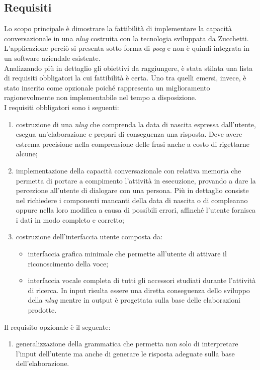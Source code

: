 	\subsection{Requisiti}
	Lo scopo principale è dimostrare la fattibilità di implementare la capacità conversazionale in una \emph{\gls{nlug}} costruita con la tecnologia sviluppata da Zucchetti. L'applicazione perciò si presenta sotto forma di \emph{\gls{pocg}} e non è quindi integrata in un software aziendale esistente. \\
	Analizzando più in dettaglio gli obiettivi da raggiungere, è stata stilata una lista di requisiti obbligatori la cui fattibilità è certa. Uno tra quelli emersi, invece, è stato inserito come opzionale poiché rappresenta un miglioramento ragionevolmente non implementabile nel tempo a disposizione. \\
	I requisiti obbligatori sono i seguenti:
	\begin{enumerate}
		\item costruzione di una \emph{\gls{nlug}} che comprenda la data di nascita espressa dall'utente, esegua un'elaborazione e prepari di conseguenza una risposta. Deve avere estrema precisione nella comprensione delle frasi anche a costo di rigettarne alcune;
		\item implementazione della capacità conversazionale con relativa memoria che permetta di portare a compimento l'attività in esecuzione, provando a dare la percezione all'utente di dialogare con una persona. Più in dettaglio consiste nel richiedere i componenti mancanti della data di nascita o di compleanno oppure nella loro modifica a causa di possibili errori, affinché l'utente fornisca i dati in modo completo e corretto;
		\item costruzione dell'interfaccia utente composta da:
		\begin{itemize}
			\item interfaccia grafica minimale che permette all'utente di attivare il riconoscimento della voce;
			\item interfaccia vocale completa di tutti gli accessori studiati durante l'attività di ricerca. In input risulta essere una diretta conseguenza dello sviluppo della \emph{\gls{nlug}} mentre in output è progettata sulla base delle elaborazioni prodotte.
		\end{itemize}
	\end{enumerate}
	Il requisito opzionale è il seguente:
	\begin{enumerate}
		\item generalizzazione della grammatica che permetta non solo di interpretare l'input dell'utente ma anche di generare le risposta adeguate sulla base dell'elaborazione.
	\end{enumerate}
